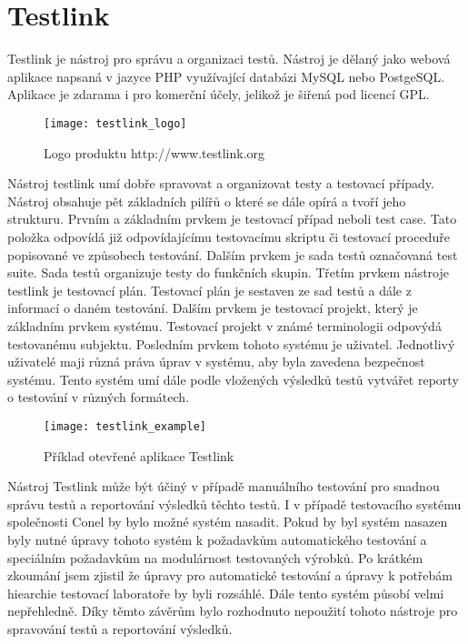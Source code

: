 \section{Testlink}
Testlink je nástroj pro správu a organizaci testů. Nástroj je dělaný jako webová aplikace napsaná v jazyce PHP využívající databázi MySQL nebo PostgeSQL. Aplikace je zdarama i pro komerční účely, jelikož je šiřená pod licencí GPL.

\begin{figure}[h]
  \centering
  \texttt{[image: testlink\_logo]}
  \caption{Logo produktu http://www.testlink.org}
  \label{fig:testlink_logo}
\end{figure}

Nástroj testlink umí dobře spravovat a organizovat testy a testovací případy. Nástroj obsahuje pět základních pilířů o které se dále opírá a tvoří jeho strukturu. Prvním a základním prvkem je testovací případ neboli test case. Tato položka odpovídá již odpovídajícímu testovacímu skriptu či testovací proceduře popisované ve způsobech testování. Dalším prvkem je sada testů označovaná test suite. Sada testů organizuje testy do funkčních skupin. Třetím prvkem nástroje testlink je testovací plán. Testovací plán je sestaven ze sad testů a dále z informací o daném testování. Dalším prvkem je testovací projekt, který je základním prvkem systému. Testovací projekt v známé terminologii odpovýdá testovanému subjektu. Posledním prvkem tohoto systému je uživatel. Jednotlivý uživatelé maji různá práva úprav v systému, aby byla zavedena bezpečnost systému. Tento systém umí dále podle vložených výsledků testů vytvářet reporty o testování v různých formátech.

\begin{figure}[h]
  \centering
  \texttt{[image: testlink\_example]}
  \caption{Příklad otevřené aplikace Testlink}
  \label{fig:testlink_example}
\end{figure}

Nástroj Testlink může být účiný v případě manuálního testování pro snadnou správu testů a reportování výsledků těchto testů. I v případě testovacího systému společnosti Conel by bylo možné systém nasadit. Pokud by byl systém nasazen byly nutné úpravy tohoto systém k požadavkům automatického testování a speciálním požadavkům na modulárnost testovaných výrobků. Po krátkém zkoumání jsem zjistil že úpravy pro automatické testování a úpravy k potřebám hiearchie testovací laboratoře by byli rozsáhlé. Dále tento systém působí velmi nepřehledně. Díky těmto závěrům bylo rozhodnuto nepoužití tohoto nástroje pro spravování testů a reportování výsledků.

